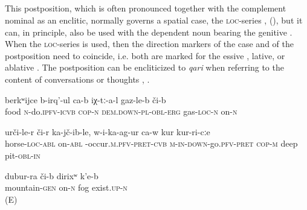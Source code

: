 
\subsection{ }
\label{ssec:postposition ci}

This postposition, which is often pronounced together with the complement nominal as an enclitic, normally governs a spatial case, the \textsc{loc}-series ,  (), but it can, in principle, also be used with the dependent noun bearing the genitive . When the \textsc{loc}-series is used, then the direction markers of the case and of the postposition need to coincide, i.e. both are marked for the essive , lative, or ablative . The postposition can be encliticized to \textit{qari} when referring to the content of conversations or thoughts , . 
%
\begin{exe}
	\ex
	\begin{xlist}
		\ex	\label{They are making food on a gas cooker}
		\gll	berkʷijce	b-irq'-ul	ca-b	iχ-tː-a-l	gaz-le-b	či-b  \\
			food	\textsc{n}-do.\textsc{ipfv}-\textsc{icvb} \textsc{cop}-\textsc{n}	\textsc{dem.down}-\textsc{pl}-\textsc{obl}-\textsc{erg}		gas-\textsc{loc}-\textsc{n}	on-\textsc{n}\\
		\glt	{}

		\ex	\label{He fell down from the horse into a deep pit}
		\gll	urči-le-r	či-r	ka-jč-ib-le,	w-i-ka-ag-ur	ca-w	kur	kur-ri-cːe   \\
			horse-\textsc{loc}-\textsc{abl}	on-\textsc{abl}	-occur.\textsc{m}.\textsc{pfv}-\textsc{pret}-\textsc{cvb}	\textsc{m-in-down}-go.\textsc{pfv}-\textsc{pret}	\textsc{cop-m}	deep	pit-\textsc{obl}-\textsc{in}\\
		\glt	{}

		\ex	\label{There is fog on / above the mountain}
		\gll	dubur-ra	či-b	dirixʷ	k'e-b\\
			mountain-\textsc{gen}	on-\textsc{n}	fog	exist.\textsc{up-n}\\
		\glt	{} (E)
	\end{xlist}
\end{exe}

